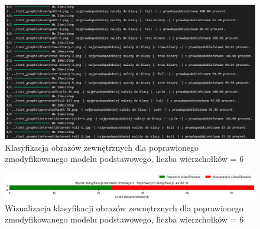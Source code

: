 
\begin{figure}[ht]
	\centering
	\includegraphics[width=14cm]{resources/tests/images/v4/base6_1_1_txt.png}
	\caption{Klasyfikacja obrazów zewnętrznych dla poprawionego zmodyfikowanego modelu podstawowego, liczba wierzchołków = 6}
	\label{Fig:tests-base-6b}
\end{figure}
\FloatBarrier

\begin{figure}[ht]
	\centering
	\includegraphics[width=14cm]{resources/tests/images/v4/base6_1_1_bar.png}
	\caption{Wizualizacja klasyfikacji obrazów zewnętrznych dla poprawionego zmodyfikowanego modelu podstawowego, liczba wierzchołków = 6}
	\label{Fig:tests-base-6c}
\end{figure}
\FloatBarrier

